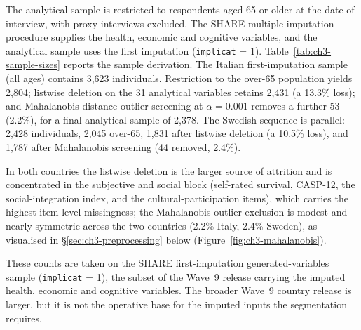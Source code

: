 The analytical sample is restricted to respondents aged 65 or older at the date of interview, with proxy interviews excluded. The SHARE multiple-imputation procedure supplies the health, economic and cognitive variables, and the analytical sample uses the first imputation (\texttt{implicat} = 1). Table~\ref{tab:ch3-sample-sizes} reports the sample derivation. The Italian first-imputation sample (all ages) contains 3,623 individuals. Restriction to the over-65 population yields 2,804; listwise deletion on the 31 analytical variables retains 2,431 (a 13.3\% loss); and Mahalanobis-distance outlier screening at $\alpha = 0.001$ removes a further 53 (2.2\%), for a final analytical sample of 2,378. The Swedish sequence is parallel: 2,428 individuals, 2,045 over-65, 1,831 after listwise deletion (a 10.5\% loss), and 1,787 after Mahalanobis screening (44 removed, 2.4\%).

In both countries the listwise deletion is the larger source of attrition and is concentrated in the subjective and social block (self-rated survival, CASP-12, the social-integration index, and the cultural-participation items), which carries the highest item-level missingness; the Mahalanobis outlier exclusion is modest and nearly symmetric across the two countries (2.2\% Italy, 2.4\% Sweden), as visualised in \S\ref{sec:ch3-preprocessing} below (Figure~\ref{fig:ch3-mahalanobis}).

These counts are taken on the SHARE first-imputation generated-variables sample (\texttt{implicat} = 1), the subset of the Wave~9 release carrying the imputed health, economic and cognitive variables. The broader Wave~9 country release is larger, but it is not the operative base for the imputed inputs the segmentation requires.

